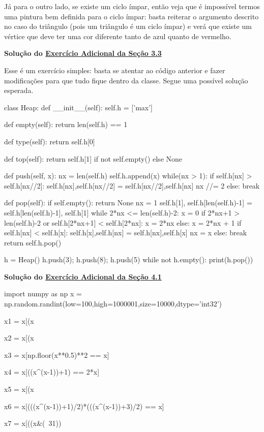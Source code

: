 \documentclass[11pt, a4paper]{article}
\begin{document}
Já para o outro lado, se existe um ciclo ímpar, então veja que é impossível termos uma pintura bem definida para o ciclo ímpar: basta reiterar o argumento descrito no caso do triângulo (pois um triângulo é um ciclo ímpar) e verá que existe um vértice que deve ter uma cor diferente tanto de azul quanto de vermelho.

\newpage

\label{sol_ex3.3.a}
\textbf{Solução do \hyperref[ex3.3.a]{Exercício Adicional da Seção 3.3}}

Esse é um exercício simples: basta se atentar ao código anterior e fazer modificações para que tudo fique dentro da classe. Segue uma possível solução esperada.

\begin{code}
class Heap:
    def __init__(self):
        self.h = ['max']
    
    def empty(self):
        return len(self.h) == 1
    
    def type(self):
        return self.h[0]
        
    def top(self):
        return self.h[1] if not self.empty() else None
    
    def push(self, x):
        nx = len(self.h)
        self.h.append(x)
        while(nx > 1):
            if self.h[nx] > self.h[nx//2]:
                self.h[nx],self.h[nx//2] = self.h[nx//2],self.h[nx]
                nx //= 2
            else:
                break
    
    def pop(self):
        if self.empty():
            return None
        nx = 1
        self.h[1], self.h[len(self.h)-1] = self.h[len(self.h)-1], self.h[1]
        while 2*nx <= len(self.h)-2:
            x = 0
            if 2*nx+1 > len(self.h)-2 or self.h[2*nx+1] < self.h[2*nx]:
                x = 2*nx
            else:
                x = 2*nx + 1
            if self.h[nx] < self.h[x]:
                self.h[x],self.h[nx] = self.h[nx],self.h[x]
                nx = x
            else:
                break
        return self.h.pop()

h = Heap()
h.push(3); h.push(8); h.push(5)
while not h.empty():
    print(h.pop())
\end{code}

\newpage

\label{sol_ex4.1.a}
\textbf{Solução do \hyperref[ex4.1.a]{Exercício Adicional da Seção 4.1}}

\begin{code}
import numpy as np
x = np.random.randint(low=100,high=1000001,size=10000,dtype='int32')

x1 = x[(x%

x2 = x[(x%

x3 = x[np.floor(x**0.5)**2 == x]

x4 = x[((x^(x-1))+1) == 2*x]

x5 = x[(x%

x6 = x[(((x^(x-1))+1)/2)*(((x^(x-1))+3)/2) == x]

x7 = x[((x&(~31))%
\end{code}
\end{document}
